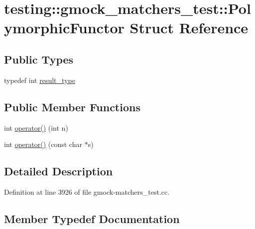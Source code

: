 \hypertarget{structtesting_1_1gmock__matchers__test_1_1_polymorphic_functor}{}\section{testing\+:\+:gmock\+\_\+matchers\+\_\+test\+:\+:Polymorphic\+Functor Struct Reference}
\label{structtesting_1_1gmock__matchers__test_1_1_polymorphic_functor}
\subsection*{Public Types}
\begin{DoxyCompactItemize}
\item 
typedef int \hyperlink{structtesting_1_1gmock__matchers__test_1_1_polymorphic_functor_ae2b921ecae158b5eaa11a29ac6fe0cf3}{result\+\_\+type}
\end{DoxyCompactItemize}
\subsection*{Public Member Functions}
\begin{DoxyCompactItemize}
\item 
int \hyperlink{structtesting_1_1gmock__matchers__test_1_1_polymorphic_functor_a2fb8b012acd2ccd52788231036877c98}{operator()} (int n)
\item 
int \hyperlink{structtesting_1_1gmock__matchers__test_1_1_polymorphic_functor_aee4d200c7f85ce4d8048d1798a511002}{operator()} (const char $\ast$s)
\end{DoxyCompactItemize}


\subsection{Detailed Description}


Definition at line 3926 of file gmock-\/matchers\+\_\+test.\+cc.



\subsection{Member Typedef Documentation}
